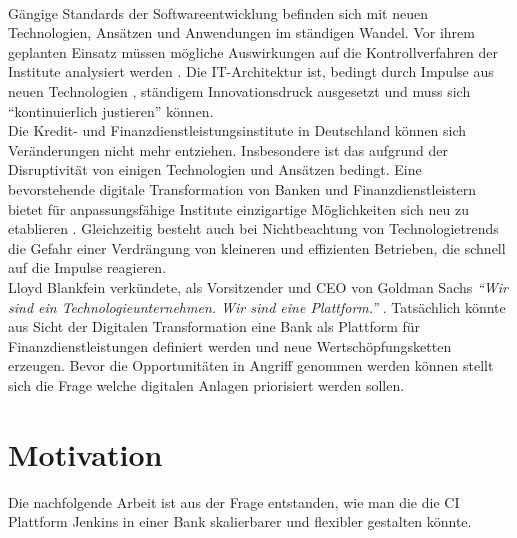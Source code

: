 \medskip
\\
Gängige Standards der Softwareentwicklung befinden sich mit neuen Technologien, Ansätzen und Anwendungen im ständigen Wandel. Vor ihrem geplanten Einsatz müssen mögliche Auswirkungen auf die Kontrollverfahren der Institute analysiert werden \cite{MaRisk:2017}.
Die IT-Architektur ist, bedingt durch Impulse aus neuen Technologien \cite{Bussmann2006}, ständigem Innovationsdruck ausgesetzt und muss sich \enquote{kontinuierlich justieren} \cite{Bussmann2006} können. 
\medskip
\\
Die Kredit- und Finanzdienstleistungsinstitute in Deutschland können sich Veränderungen nicht mehr entziehen. Insbesondere ist das aufgrund der Disruptivität von einigen Technologien \cite{Fernandez:2020} und Ansätzen bedingt. Eine bevorstehende digitale Transformation von Banken und Finanzdienstleistern bietet für anpassungsfähige Institute einzigartige Möglichkeiten sich neu zu etablieren \cite{Gupta:2017}. Gleichzeitig besteht auch bei Nichtbeachtung von Technologietrends die Gefahr einer Verdrängung von kleineren und effizienten Betrieben, die schnell auf die Impulse reagieren.
\medskip
\\
Lloyd Blankfein verkündete, als Vorsitzender und \ac{CEO} von Goldman Sachs \emph{\enquote{Wir sind ein Technologieunternehmen. Wir sind eine Plattform.}} \cite{Gupta:2017}. Tatsächlich könnte aus Sicht der Digitalen Transformation eine Bank als Plattform für Finanzdienstleistungen definiert werden und neue Wertschöpfungsketten erzeugen. 
Bevor die Opportunitäten in Angriff genommen werden können stellt sich die Frage welche digitalen Anlagen priorisiert werden sollen.
\medskip
\\
%
%
\section{Motivation}
\label{sec:intro:motivation}

Die nachfolgende Arbeit ist aus der Frage entstanden, wie man die die CI Plattform Jenkins in einer Bank skalierbarer und flexibler gestalten könnte.

